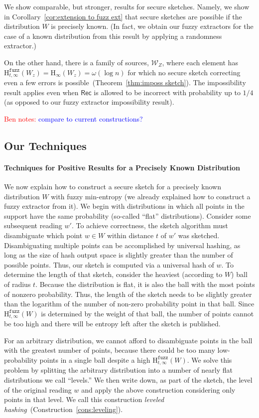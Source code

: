 \documentclass[11pt]{article}
\newcommand{\thref}[1]{\mbox{Theorem~\ref{#1}}}
\newcommand{\corref}[1]{\mbox{Corollary~\ref{#1}}}
\newcommand{\consref}[1]{\mbox{Construction~\ref{#1}}}
\newcommand{\class}[1]{{\ensuremath{\mathsf{#1}}}}
\newcommand{\rec}{\ensuremath{\class{Rec}}\xspace}
\newcommand{\Hoo}{\mathrm{H}_\infty}
\newcommand{\Hfuzz}{\mathrm{H}^{\mathtt{fuzz}}_{t,\infty}}
\newcommand{\authnote}[2]{{\textcolor{red}{\textsf{#1 notes: }\textcolor{blue}{ #2}}\marginpar{\textcolor{red}{\textbf{!!!!!}}}}}
\newcommand{\authnote}[2]{}
\newcommand{\bnote}[1]{{\authnote{Ben}{#1}}}
\begin{document}
We show comparable, but stronger, results for secure sketches.  Namely, we show in \corref{cor:extension to fuzz ext} that secure sketches are possible if the distribution $W$ is precisely known. (In fact, we obtain our fuzzy extractors for the case of a known distribution from this result by applying a randomness extractor.) 

On the other hand, there is a family of sources, $\mathcal{W}_Z$, where each element has $\Hfuzz(W_z)=\Hoo(W_z) = \omega(\log n)$ for which no secure sketch correcting even a few errors is possible~(\thref{thm:imposs sketch}). The impossibility result applies even when $\rec$ is allowed to be incorrect with probability up to $1/4$ (as opposed to our fuzzy extractor impossibility result). 

\bnote{compare to current constructions?}
\subsection{Our Techniques}

\paragraph{Techniques for Positive Results for a Precisely Known Distribution} We now explain how to construct a secure sketch for a precisely known distribution $W$ with fuzzy min-entropy (we already explained how to construct a fuzzy extractor from it).  We begin with distributions in which all points in the support have the same probability (so-called ``flat'' distributions).   Consider some subsequent reading $w'$. To achieve correctness, the sketch algorithm must disambiguate which point $w\in W$ within distance $t$ of $w'$ was sketched. Disambiguating multiple points can be accomplished by universal hashing, as long as the size of hash output space is slightly greater than the number of possible points. Thus, our sketch is computed via a universal hash of $w$. To determine the length of that sketch, consider the heaviest (according to $W$) ball of radius $t$. Because the distribution is flat, it is also the ball with the most points of nonzero probability. Thus, the length of the sketch needs to be slightly greater than the logarithm of the number of non-zero probability point in that ball. Since $\Hfuzz(W)$ is determined by the weight of that ball, the number of points cannot be too high and there will be entropy left after the sketch is published.

For an arbitrary distribution, we cannot afford to disambiguate points in the ball with the greatest number of points, because there could be too many low-probability points in a single ball despite a high $\Hfuzz(W)$.  We solve this problem by splitting the arbitrary distribution into a number of nearly flat distributions we call ``levels.''  We then write down, as part of the sketch, the level of the original reading $w$ and apply the above construction considering only points in that level.  We call this construction \emph{leveled hashing}~(\consref{cons:leveling}).
\end{document}
